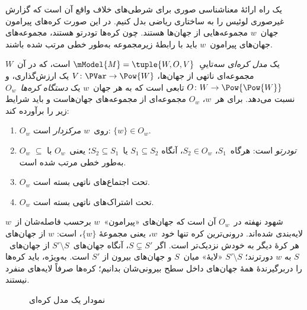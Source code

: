 \documentclass[../../../include/open-logic-section]{subfiles}
\begin{document}


یک راه ارائهٔ معناشناسی صوری برای شرطی‌های خلاف واقع آن است که گزارش
غیرصوری لوئیس را به ساختاری ریاضی بدل کنیم. در این صورت کره‌های پیرامون
جهان~$w$ مجموعه‌هایی از جهان‌ها هستند. چون کره‌ها تودرتو هستند،
مجموعه‌های جهان‌های پیرامون~$w$ باید با رابطهٔ زیرمجموعه به‌طور خطی
مرتب شده باشند.

\begin{defn}
  یک \emph{مدل کره‌ای} سه‌تاییِ~$\mModel{M} = \tuple{W, O, V}$ است،
  که در آن~$W$ مجموعه‌ای ناتهی از جهان‌ها،
  $V\colon \PVar \to \Pow{W}$ یک ارزش‌گذاری، و
  $O\colon W \to \Pow{\Pow{W}}$ تابعی است که به هر جهان~$w$ یک
  \emph{دستگاه کره‌ها}~$O_w$ نسبت می‌دهد. برای هر~$w$، $O_w$ مجموعه‌ای
  از مجموعه‌های جهان‌هاست و باید شرایط زیر را برآورده کند:
  \begin{enumerate}
  \item $O_w$ روی~$w$ \emph{مرکزدار} است: $\{w\} \in O_w$.
  \item $O_w$ \emph{تودرتو} است: هرگاه~$S_1$، $S_2 \in O_w$، آنگاه
    $S_1 \subseteq S_2$ یا~$S_2 \subseteq S_1$؛ یعنی~$O_w$ با
    $\subseteq$ به‌طور خطی مرتب شده است.
  \item $O_w$ تحت اجتماع‌های ناتهی بسته است.
  \item $O_w$ تحت اشتراک‌های ناتهی بسته است.
  \end{enumerate}
\end{defn}

شهود نهفته در~$O_w$ آن است که جهان‌های «پیرامون»~$w$ برحسب فاصله‌شان
از~$w$ لایه‌بندی شده‌اند. درونی‌ترین کره تنها خود~$w$، یعنی مجموعهٔ
$\{w\}$، است: $w$ از جهان‌های هر کرهٔ دیگر به خودش نزدیک‌تر است. اگر
$S \subsetneq S'$، آنگاه جهان‌های~$S' \setminus S$ از جهان‌های~$S$ به
$w$ دورترند؛ $S' \setminus S$ «لایهٔ» میان~$S$ و جهان‌های بیرون از
$S'$ است. به‌ویژه، باید کره‌ها را دربرگیرندهٔ همهٔ جهان‌های داخل سطح
بیرونی‌شان بدانیم؛ کره‌ها صرفاً لایه‌های منفرد نیستند.

\begin{figure}
\begin{center}
\caption{نمودار یک مدل کره‌ای}
\end{center}
\end{figure}
\end{document}
